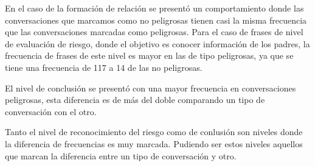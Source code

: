 En el caso de la formaci\'on de relaci\'on se present\'o un comportamiento donde las conversaciones que marcamos como no peligrosas tienen casi la misma frecuencia que las conversaciones marcadas como peligrosas. Para el caso de frases de nivel de evaluaci\'on de riesgo, donde el objetivo es conocer informaci\'on de los padres, la frecuencia de frases de este nivel es mayor en las de tipo peligrosas, ya que se tiene una frecuencia de 117 a 14 de las no peligrosas. 

El nivel de conclusi\'on se present\'o con una mayor frecuencia en conversaciones peligrosas, esta diferencia es de m\'as del doble comparando un tipo de conversaci\'on con el otro.

Tanto el nivel de reconocimiento del riesgo como de conlusi\'on son niveles donde la diferencia de frecuencias es muy marcada. Pudiendo ser estos niveles aquellos que marcan la diferencia entre un tipo de conversaci\'on y otro. 
